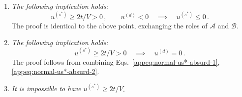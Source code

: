 \begin{tabproof}
\begin{enumerate}
	From Eq.~\eqref{appeq:BZ-A-def}, $\forall \mathbf{k} \in \mathcal{A}$ the functions $\cos k_x \pm \cos k_y$ are positive by construction. By hypothesis $\epsilon^{(s^*)} \ge 0$ and $\epsilon^{(d)} > 0$. Hence:
	\[
	\forall \mathbf{k} \in \mathcal{A}
	\quad\colon\quad
	\begin{aligned}
		\tilde{\epsilon}_\mathbf{k} &= \overbrace{\epsilon^{(s^*)} \left( \cos k_x + \cos k_y \right)}^{\ge 0} + \overbrace{\epsilon^{(d)}  \left( \cos k_x - \cos k_y \right) }^{\ge 0} \, , \\
		\tilde{\epsilon}_{\mathcal{R}\mathbf{k}} &= \underbrace{\epsilon^{(s^*)} \left( \cos k_x + \cos k_y \right)}_{\ge 0} - \underbrace{\epsilon^{(d)}  \left( \cos k_x - \cos k_y \right) }_{\ge 0} \, .
	\end{aligned}
	\]
	Summing the two equations above we have:
	\[
		\forall \mathbf{k} \in \mathcal{A}
		\quad\colon\quad
		\tilde{\epsilon}_\mathbf{k} + \tilde{\epsilon}_{\mathcal{R}\mathbf{k}} \ge 0 \, ,
	\]
	thus $\tilde{\epsilon}_\mathbf{k} \ge -\tilde{\epsilon}_{\mathcal{R}\mathbf{k}}$.	The Fermi-Dirac distribution is monotonically descendent. Then:
	\[
	\forall \mathbf{k} \in \mathcal{A}
	\quad\colon\quad
	\begin{aligned}
		f(\tilde{\epsilon}_\mathbf{k};\beta,\tilde{\mu}) &\le f(-\tilde{\epsilon}_{\mathcal{R}\mathbf{k}};\beta,\tilde{\mu}) \, , \\
		f(-\tilde{\epsilon}_\mathbf{k};\beta,\tilde{\mu}) &\ge f(\tilde{\epsilon}_{\mathcal{R}\mathbf{k}};\beta,\tilde{\mu}) \, . 
	\end{aligned}
	\]
	This condition, inserted in Eq.~\eqref{appeq:normal-us*-AR}, leads to the absurd of Eq.~\eqref{appeq:normal-us*-absurd-1}.
	\item \textit{The following implication holds:}
	\begin{equation}\label{appeq:normal-us*-absurd-2}
		u^{(s^*)} \ge 2t/V > 0 \, ,
		\qquad
		u^{(d)} < 0
		\quad\implies\quad
		u^{(s^*)} \le 0 \, .
	\end{equation}
	The proof is identical to the above point, exchanging the roles of $\mathcal{A}$ and $\mathcal{B}$.
	\item \textit{The following implication holds:}
	\begin{equation}\label{appeq:normal-us*-no-nematic-1}
		u^{(s^*)} \ge 2t/V > 0
		\quad\implies\quad
		u^{(d)} = 0 \, .
	\end{equation}
	The proof follows from combining Eqs.~\eqref{appeq:normal-us*-absurd-1}, \eqref{appeq:normal-us*-absurd-2}.
	\item \textit{It is impossible to have $u^{(s^*)} \ge 2t/V$}.
	

\end{enumerate}
\end{tabproof}
